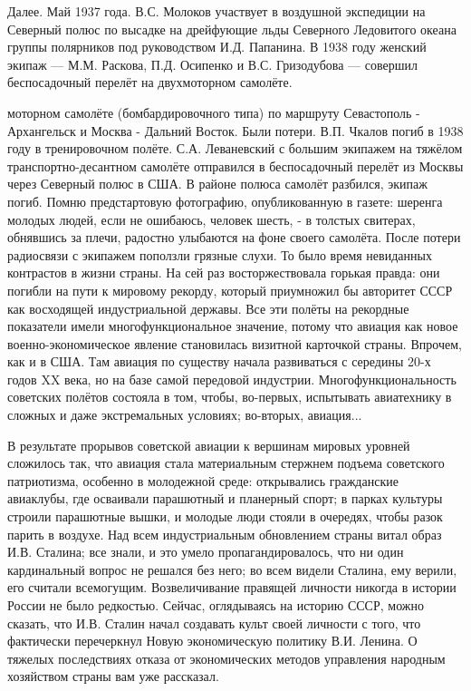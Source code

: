 Далее. Май 1937 года. В.С. Молоков участвует в воздушной экспедиции на Северный полюс по высадке на дрейфующие льды Северного Ледовитого океана группы полярников под руководством И.Д. Папанина. В 1938 году женский экипаж — М.М. Раскова, П.Д. Осипенко и В.С. Гризодубова — совершил беспосадочный перелёт на двухмоторном самолёте.

\label{176-1}
моторном самолёте (бомбардировочного типа) по маршруту Севастополь - Архангельск и Москва - Дальний Восток. Были потери. В.П. Чкалов погиб в 1938 году в тренировочном полёте. С.А. Леваневский с большим экипажем на тяжёлом транспортно-десантном самолёте отправился в беспосадочный перелёт из Москвы через Северный полюс в США. В районе полюса самолёт разбился, экипаж погиб.
Помню предстартовую фотографию, опубликованную в газете: шеренга молодых людей, если не ошибаюсь, человек шесть, - в толстых свитерах, обнявшись за плечи, радостно улыбаются на фоне своего самолёта. После потери радиосвязи с экипажем поползли грязные слухи. То было время невиданных контрастов в жизни страны. На сей раз восторжествовала горькая правда: они погибли на пути к мировому рекорду, который приумножил бы авторитет СССР как восходящей индустриальной державы.
Все эти полёты на рекордные показатели имели многофункциональное значение, потому что авиация как новое военно-экономическое явление становилась визитной карточкой страны. Впрочем, как и в США. Там авиация по существу начала развиваться с середины 20-х годов XX века, но на базе самой передовой индустрии. Многофункциональность советских полётов состояла в том, чтобы, во-первых, испытывать авиатехнику в сложных и даже экстремальных условиях; во-вторых, авиация...

\label{177-1}
В результате прорывов советской авиации к вершинам мировых уровней сложилось так, что авиация стала материальным стержнем подъема советского патриотизма, особенно в молодежной среде: открывались гражданские авиаклубы, где осваивали парашютный и планерный спорт; в парках культуры строили парашютные вышки, и молодые люди стояли в очередях, чтобы разок парить в воздухе. Над всем индустриальным обновлением страны витал образ И.В. Сталина; все знали, и это умело пропагандировалось, что ни один кардинальный вопрос не решался без него; во всем видели Сталина, ему верили, его считали всемогущим. Возвеличивание правящей личности никогда в истории России не было редкостью. Сейчас, оглядываясь на историю СССР, можно сказать, что И.В. Сталин начал создавать культ своей личности с того, что фактически перечеркнул Новую экономическую политику В.И. Ленина. О тяжелых последствиях отказа от экономических методов управления народным хозяйством страны вам уже рассказал.

